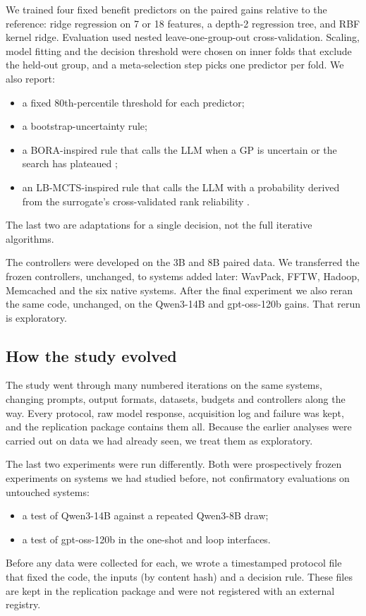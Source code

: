 We trained four fixed benefit predictors on the paired gains relative to the reference: ridge regression on 7 or 18 features, a depth-2 regression tree, and RBF kernel ridge. Evaluation used nested leave-one-group-out cross-validation. Scaling, model fitting and the decision threshold were chosen on inner folds that exclude the held-out group, and a meta-selection step picks one predictor per fold. We also report:
\begin{itemize}
  \item a fixed 80th-percentile threshold for each predictor;
  \item a bootstrap-uncertainty rule;
  \item a BORA-inspired rule that calls the LLM when a GP is uncertain or the search has plateaued \cite{cisse2025bora};
  \item an LB-MCTS-inspired rule that calls the LLM with a probability derived from the surrogate's cross-validated rank reliability \cite{xu2026lbmcts}.
\end{itemize}
The last two are adaptations for a single decision, not the full iterative algorithms.

The controllers were developed on the 3B and 8B paired data. We transferred the frozen controllers, unchanged, to systems added later: WavPack, FFTW, Hadoop, Memcached and the six native systems. After the final experiment we also reran the same code, unchanged, on the Qwen3-14B and gpt-oss-120b gains. That rerun is exploratory.

\subsection{How the study evolved}
\label{sec:history}

The study went through many numbered iterations on the same systems, changing prompts, output formats, datasets, budgets and controllers along the way. Every protocol, raw model response, acquisition log and failure was kept, and the replication package contains them all. Because the earlier analyses were carried out on data we had already seen, we treat them as exploratory.

The last two experiments were run differently. Both were prospectively frozen experiments on systems we had studied before, not confirmatory evaluations on untouched systems:
\begin{itemize}
  \item a test of Qwen3-14B against a repeated Qwen3-8B draw;
  \item a test of gpt-oss-120b in the one-shot and loop interfaces.
\end{itemize}
Before any data were collected for each, we wrote a timestamped protocol file that fixed the code, the inputs (by content hash) and a decision rule. These files are kept in the replication package and were not registered with an external registry.

